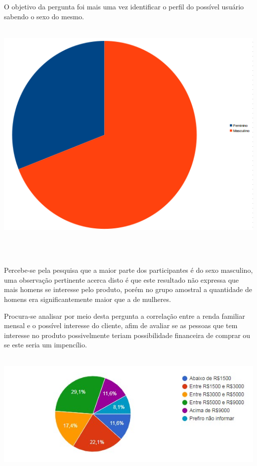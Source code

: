 \begin{apendicesenv}
O objetivo da pergunta foi mais uma vez identificar o perfil do possível usuário sabendo o sexo do mesmo. 
\begin{center}
    \includegraphics[scale=0.7]{figuras/sexo}
       \label{sexo}
   \end{center}  
 
Percebe-se pela pesquisa que a maior parte dos participantes é do sexo masculino, uma observação pertinente acerca disto é que este resultado não expressa que mais homens se interesse pelo produto, porém no grupo amostral a quantidade de homens era significantemente maior que a de mulheres. 


Procura-se analisar por meio desta pergunta a correlação entre a renda familiar mensal e o possível interesse do cliente, afim de avaliar se as pessoas que tem interesse no produto possivelmente teriam possibilidade financeira de comprar ou se este seria um impencílio.

\begin{center}
    \includegraphics[scale=0.7]{figuras/renda}
       \label{renda}
   \end{center}  
 

\end{apendicesenv}
